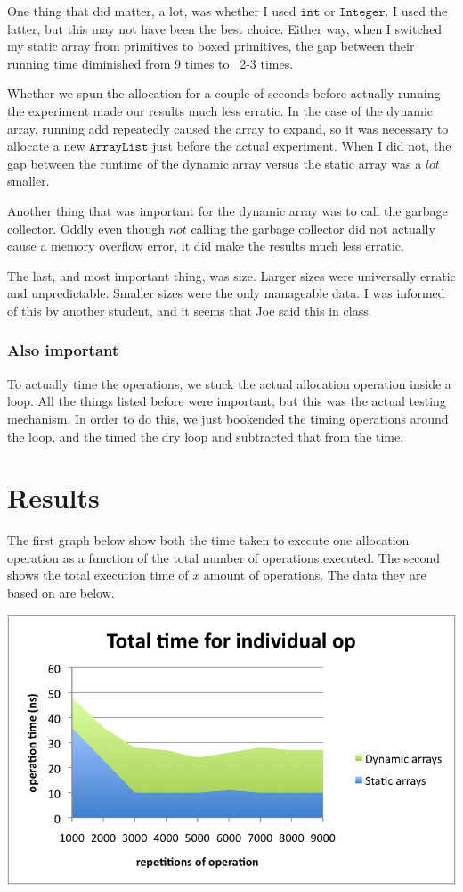 \documentclass[a4paper]{article}
\begin{document}
One thing that did matter, a lot, was whether I used $\texttt{int}$ or $\texttt{Integer}$. I used the latter, but this may not have been the best choice. Either way, when I switched my static array from primitives to boxed primitives, the gap between their running time diminished from 9 times to ~2-3 times.

Whether we spun the allocation for a couple of seconds before actually running the experiment made our results much less erratic. In the case of the dynamic array, running add repeatedly caused the array to expand, so it was necessary to allocate a new $\texttt{ArrayList}$ just before the actual experiment. When I did not, the gap between the runtime of the dynamic array versus the static array was a $\textit{lot}$ smaller.

Another thing that was important for the dynamic array was to call the garbage collector. Oddly even though $\textit{not}$ calling the garbage collector did not actually cause a memory overflow error, it did make the results much less erratic.

The last, and most important thing, was size. Larger sizes were universally erratic and unpredictable. Smaller sizes were the only manageable data. I was informed of this by another student, and it seems that Joe said this in class.

\subsubsection*{Also important}

To actually time the operations, we stuck the actual allocation operation inside a loop. All the things listed before were important, but this was the actual testing mechanism. In order to do this, we just bookended the timing operations around the loop, and the timed the dry loop and subtracted that from the time.

\section*{Results}

The first graph below show both the time taken to execute one allocation operation as a function of the total number of operations executed. The second shows the total execution time of $x$ amount of operations. The data they are based on are below.

\includegraphics{avg_op_time.png}
\end{document}
